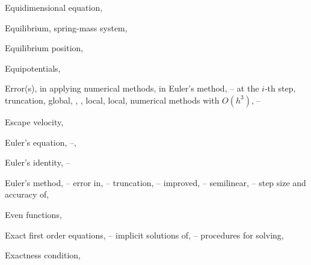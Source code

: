 \begin{theindex}
  \item Equidimensional equation, \pageref{exer:9.2.44}

  \item Equilibrium, \pageref{eq:4.4.6}
    \subitem spring-mass system, \pageref{eq:6.1.1}

  \item Equilibrium position, \pageref{eq:6.1.1}

  \item Equipotentials, \pageref{eq:4.5.16}

  \item Error(s),
    \subitem in applying numerical methods, \pageref{eq:3.1.1}
    \subitem in Euler's method, \pageref{example:3.1.2}--\pageref{eq:3.1.18}
    \subitem at the $i$-th step, \pageref{eq:3.1.1}
    \subitem truncation, \pageref{eq:3.1.1}
      \subsubitem global, \pageref{eq:3.1.18}, \pageref{eq:3.2.5}, \pageref{eq:3.3.1}
      \subsubitem local, \pageref{eq:3.1.8}
      \subsubitem local, numerical methods with $O(h^{3})$, \pageref{eq:3.2.8}--\pageref{exer:3.2.1}

  \item Escape velocity, \pageref{eq:4.3.20}

  \item Euler's equation, \pageref{thmtype:7.4.2}--\pageref{exer:7.4.20}, \pageref{exer:5.3.34}

  \item Euler's identity, \pageref{eq:3.1.2}--\pageref{exer:3.1.22}

  \item Euler's method, \pageref{eq:3.1.2}--\pageref{exer:3.1.23}
    \subitem error in, \pageref{example:3.1.2}--\pageref{eq:3.1.8}
      \subsubitem truncation, \pageref{eq:3.1.8}--\pageref{eq:3.1.18}
    \subitem improved, \pageref{eq:3.2.1}--\pageref{eq:3.2.7}
    \subitem semilinear, \pageref{eq:3.1.19}--\pageref{exer:3.1.1}
    \subitem step size and accuracy of, \pageref{example:3.1.2}

  \item Even functions, \pageref{thmtype:11.2.5}

  \item Exact first order equations, \pageref{eq:2.5.1}--\pageref{exer:2.5.44}
    \subitem implicit solutions of, \pageref{example:2.5.1}--\pageref{thmtype:2.5.1}
    \subitem procedures for solving, \pageref{eq:2.5.19}

  \item Exactness condition, \pageref{thmtype:2.5.2}


\end{theindex}
